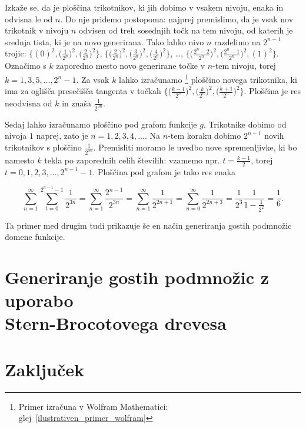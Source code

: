 \documentclass[a4paper, 12pt, titlepage]{article}
\begin{document}
Izkaže se, da je ploščina trikotnikov, ki jih dobimo v vsakem nivoju, enaka in odvisna le od $ n $. Do nje pridemo postopoma: najprej premislimo, da je vsak nov trikotnik v nivoju $ n $ odvisen od treh sosednjih točk na tem nivoju, od katerih je srednja tista, ki je na novo generirana. Tako lahko nivo $ n $ razdelimo na $ 2^{n-1} $ trojic: $ \{(0)^2, \bigl(\frac{1}{2^n}\bigr)^2,\bigl(\frac{2}{2^n}\bigr)^2\} $, $ \{\bigl(\frac{2}{2^n}\bigr)^2, \bigl(\frac{3}{2^n}\bigr)^2, \bigl(\frac{4}{2^n}\bigr)^2\} $, \ldots, $ \{\bigl(\frac{2^n-2}{2^n}\bigr)^2, \bigl(\frac{2^n-1}{2^n}\bigr)^2, (1)^2\}$. Označimo s $ k $ zaporedno mesto novo generirane točke v $ n $-tem nivoju, torej $ k = 1, 3, 5, \ldots, 2^n-1 $. Za vsak $ k $ lahko izračunamo \footnote{Primer izračuna v Wolfram Mathematici: glej~\ref{ilustrativen_primer_wolfram}} ploščino novega trikotnika, ki ima za oglišča presečišča tangenta v točkah $ \{\bigl(\frac{k-1}{2^n}\bigr)^2, \bigl(\frac{k}{2^n}\bigr)^2, \bigl(\frac{k+1}{2^n}\bigr)^2\} $. Ploščina je res neodvisna od $ k $ in znaša $ \frac{1}{2^{3n}} $.

Sedaj lahko izračunamo ploščino pod grafom funkcije $ g $. Trikotnike dobimo od nivoja $ 1 $ naprej, zato je $ n = 1, 2, 3, 4, \ldots $. Na $ n $-tem koraku dobimo $ 2^{n-1} $ novih trikotnikov s ploščino $ \frac{1}{2^{3n}} $. Premisliti moramo le uvedbo nove spremenljivke, ki bo namesto $ k $ tekla po zaporednih celih številih: vzamemo npr. $ t = \frac{k-1}{2} $, torej $ t = 0, 1, 2, 3, \ldots, 2^{n-1}-1 $. Ploščina pod grafom je tako res enaka

\begin{equation*}
    \sum_{n=1}^{\infty} \sum_{t=0}^{2^{n-1}-1} \frac{1}{2^{3n}} = \sum_{n=1}^{\infty} \frac{2^{n-1}}{2^{3n}} = \sum_{n=1}^{\infty} \frac{1}{2^{2n+1}} = \sum_{n=0}^{\infty} \frac{1}{2^{2n+3}} = \frac{1}{2^3} \frac{1}{1-\frac{1}{2^2}} = \frac{1}{6}\text{.}
\end{equation*}

Ta primer med drugim tudi prikazuje še en način generiranja gostih podmnožic domene funkcije.

\section{Generiranje gostih podmnožic z uporabo \\ Stern-Brocotovega drevesa}

\newpage
\section{Zaključek}
\end{document}
